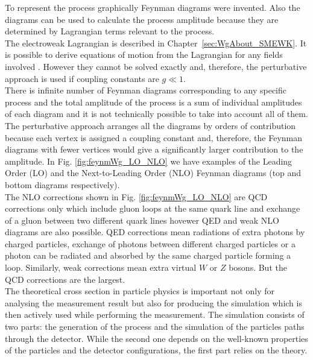 To represent the process graphically Feynman diagrams were invented. Also the diagrams can be used to calculate the process amplitude because they are determined by Lagrangian terms relevant to the process.\\

The electroweak Lagrangian is described in Chapter~\ref{sec:WgAbout_SMEWK}. It is possible to derive equations of motion from the Lagrangian for any fields involved \cite{ref_Griffiths}. However they cannot be solved exactly and, therefore, the perturbative approach is used if coupling constants are $g \ll 1$.\\

There is infinite number of Feynman diagrams corresponding to any specific process and the total amplitude of the process is a sum of individual amplitudes of each diagram and it is not technically possible to take into account all of them. The perturbative approach arranges all the diagrams by orders of contribution because each vertex is assigned a coupling constant and, therefore, the Feynman diagrams with fewer vertices would give a significantly larger contribution to the amplitude. In Fig. \ref{fig:feynmWg_LO_NLO} we have examples of the Leading Order (LO) and the Next-to-Leading Order (NLO) Feynman diagrams (top and bottom diagrams respectively).\\

The NLO corrections shown in Fig. \ref{fig:feynmWg_LO_NLO} are QCD corrections only which include gluon loops at the same quark line and exchange of a gluon between two different quark lines hovewer QED and weak NLO diagrams are also possible. QED corrections mean radiations of extra photons by charged particles, exchange of photons between different charged particles or a photon can be radiated and absorbed by the same charged particle forming a loop. Similarly, weak corrections mean extra virtual $W$ or $Z$ bosons. But the QCD corrections are the largest.\\

The theoretical cross section in particle physics is important not only for analysing the measurement result but also for producing the simulation which is then actively used while performing the measurement. The simulation consists of two parts: the generation of the process and the simulation of the particles paths through the detector. While the second one depends on the well-known properties of the particles and the detector configurations, the first part relies on the theory.\\

